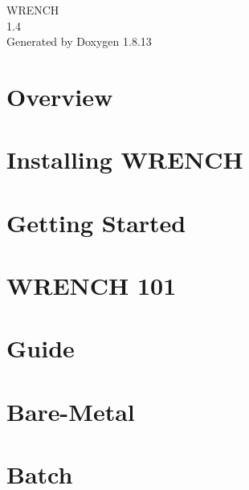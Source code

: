 \documentclass[twoside]{book}
\newcommand{\+}{\discretionary{\mbox{\scriptsize$\hookleftarrow$}}{}{}}
\newcommand{\clearemptydoublepage}{%
  \newpage{\pagestyle{empty}\cleardoublepage}%
}
\begin{document}
\hypersetup{pageanchor=false,
             bookmarksnumbered=true,
             pdfencoding=unicode
            }
\begin{titlepage}
\vspace*{7cm}
\begin{center}%
{\Large W\+R\+E\+N\+CH \\[1ex]\large 1.\+4 }\\
\vspace*{1cm}
{\large Generated by Doxygen 1.8.13}\\
\end{center}
\end{titlepage}
\clearemptydoublepage
{}
\tableofcontents
\clearemptydoublepage
{}
\hypersetup{pageanchor=true}

\chapter{Overview}
\label{index}\hypertarget{index}{}
\chapter{Installing W\+R\+E\+N\+CH}
\label{install}

\chapter{Getting Started}
\label{getting-started}

\chapter{W\+R\+E\+N\+CH 101}
\label{wrench-101}

\chapter{Guide}
\label{guide}

\chapter{Bare-\/\+Metal}
\label{guide-baremetal}

\chapter{Batch}
\label{guide-batch}

\end{document}
